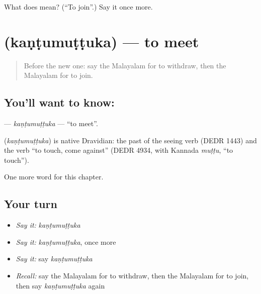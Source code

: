 \begin{tcolorbox}[breakable,colback=teal!4,colframe=teal!35!black,title={Before you move on}]
What does  mean? (\textquotedblleft{}To join\textquotedblright{}.) Say it once more.
\end{tcolorbox}
\section[\texorpdfstring{\ml{കണ്ടുമുട്ടുക} (kaṇṭumuṭṭuka)}{കണ്ടുമുട്ടുക (kaṇṭumuṭṭuka)}]{ (kaṇṭumuṭṭuka) — to meet}

\label{lesson:ML-C305-kantumuttuka}



\begin{quote}
Before the new one: say the Malayalam for to withdraw, then the Malayalam for to join.
\end{quote}

\subsection*{You'll want to know: }
\textbf{} — \emph{kaṇṭumuṭṭuka} — \textquotedblleft{}to meet\textquotedblright{}.

\begin{cousinweb}
\textbf{} (\emph{kaṇṭumuṭṭuka}) is native Dravidian: the past of the seeing verb (DEDR 1443) and the verb \textquotedblleft{}to touch, come against\textquotedblright{} (DEDR 4934, with Kannada \emph{muṭṭu}, \textquotedblleft{}to touch\textquotedblright{}).
\end{cousinweb}

\begin{grammarlens}[title={What you've built}]
One more word for this chapter.
\end{grammarlens}

\subsection*{Your turn}
\begin{itemize}
\raggedright
  \item \emph{Say it:} \emph{kaṇṭumuṭṭuka}
  \item \emph{Say it:} \emph{kaṇṭumuṭṭuka}, once more
  \item \emph{Say it:} say \emph{kaṇṭumuṭṭuka}
  \item \emph{Recall:} say the Malayalam for to withdraw, then the Malayalam for to join, then say \emph{kaṇṭumuṭṭuka} again
\end{itemize}

